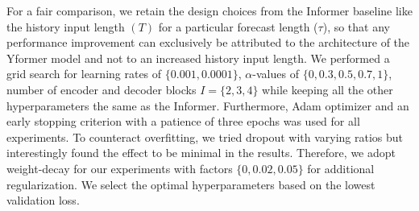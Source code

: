 For a fair comparison, we retain the design choices from the Informer baseline like the history input length $(T)$ for a particular forecast length ($\tau$), so that any performance improvement can exclusively be attributed to the architecture of the Yformer model and not to an increased history input length. We performed a grid search for learning rates of $\{0.001, 0.0001\}$, $\alpha$-values of $\{0, 0.3, 0.5, 0.7, 1\}$, number of encoder and decoder blocks  $I = \{2, 3, 4\}$ while keeping all the other hyperparameters the same as the Informer. Furthermore, Adam optimizer and an early stopping criterion with a patience of three epochs was used for all experiments. To counteract overfitting, we tried dropout with varying ratios but interestingly found the effect to be minimal in the results. Therefore, we adopt weight-decay for our experiments with factors $\{0, 0.02, 0.05\}$ for additional regularization. We select the optimal hyperparameters based on the lowest validation loss. 

